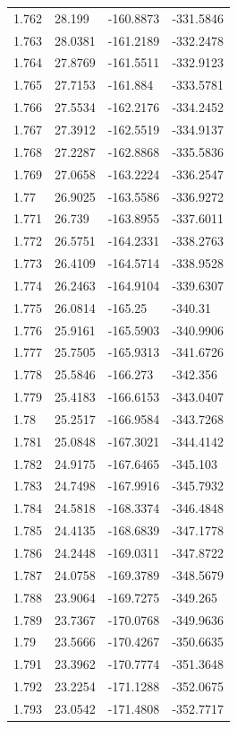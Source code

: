 \begin{tabular}{llll}
1.762 & 28.199 & -160.8873 & -331.5846 \\
1.763 & 28.0381 & -161.2189 & -332.2478 \\
1.764 & 27.8769 & -161.5511 & -332.9123 \\
1.765 & 27.7153 & -161.884 & -333.5781 \\
1.766 & 27.5534 & -162.2176 & -334.2452 \\
1.767 & 27.3912 & -162.5519 & -334.9137 \\
1.768 & 27.2287 & -162.8868 & -335.5836 \\
1.769 & 27.0658 & -163.2224 & -336.2547 \\
1.77 & 26.9025 & -163.5586 & -336.9272 \\
1.771 & 26.739 & -163.8955 & -337.6011 \\
1.772 & 26.5751 & -164.2331 & -338.2763 \\
1.773 & 26.4109 & -164.5714 & -338.9528 \\
1.774 & 26.2463 & -164.9104 & -339.6307 \\
1.775 & 26.0814 & -165.25 & -340.31 \\
1.776 & 25.9161 & -165.5903 & -340.9906 \\
1.777 & 25.7505 & -165.9313 & -341.6726 \\
1.778 & 25.5846 & -166.273 & -342.356 \\
1.779 & 25.4183 & -166.6153 & -343.0407 \\
1.78 & 25.2517 & -166.9584 & -343.7268 \\
1.781 & 25.0848 & -167.3021 & -344.4142 \\
1.782 & 24.9175 & -167.6465 & -345.103 \\
1.783 & 24.7498 & -167.9916 & -345.7932 \\
1.784 & 24.5818 & -168.3374 & -346.4848 \\
1.785 & 24.4135 & -168.6839 & -347.1778 \\
1.786 & 24.2448 & -169.0311 & -347.8722 \\
1.787 & 24.0758 & -169.3789 & -348.5679 \\
1.788 & 23.9064 & -169.7275 & -349.265 \\
1.789 & 23.7367 & -170.0768 & -349.9636 \\
1.79 & 23.5666 & -170.4267 & -350.6635 \\
1.791 & 23.3962 & -170.7774 & -351.3648 \\
1.792 & 23.2254 & -171.1288 & -352.0675 \\
1.793 & 23.0542 & -171.4808 & -352.7717 \\

\end{tabular}
